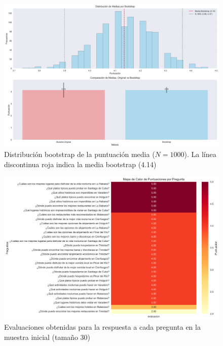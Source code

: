 \documentclass[10pt]{llncs}
\begin{document}
\begin{figure}
\centering
\includegraphics[width=1\textwidth]{../src/experiments/specialized_agents/bootstrap_distribution_20250617-171856.png}
\caption{Distribución bootstrap de la puntuación media ($N=1000$). La línea discontinua roja indica la media bootstrap (4.14)}
\label{fig:boot_dist_2}
\end{figure}

\begin{figure}
\centering
\includegraphics[width=1\textwidth]{../src/experiments/specialized_agents/quality_heatmap_20250617-171856.png}
\caption{Evaluaciones obtenidas para la respuesta a cada pregunta en la muestra inicial (tamaño 30)}
\label{fig:eval_2}
\end{figure}
\end{document}
